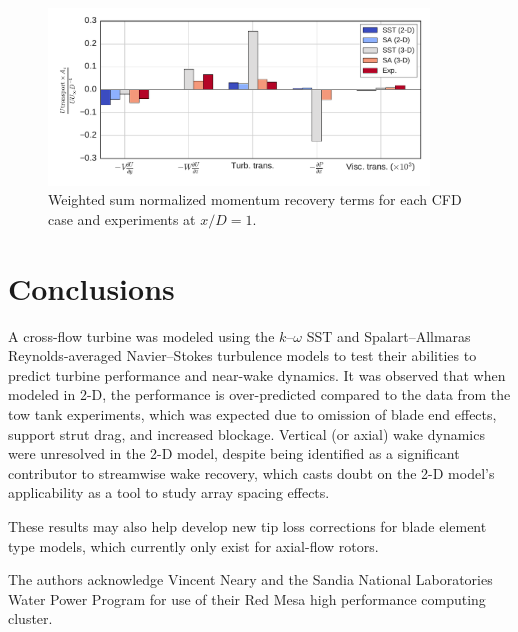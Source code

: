 \documentclass[aip,graphicx]{revtex4-1}
\begin{document}
\begin{figure}[ht]
    \centering

    \includegraphics[width=0.9\textwidth]{figures/mom_bar_graph}

    \caption{Weighted sum normalized momentum recovery terms for each CFD case
        and experiments\cite{Bachant2015-RVAT-Re-dep-data} at $x/D=1$.}

    \label{fig:recovery}
\end{figure}


\section{Conclusions}

A cross-flow turbine was modeled using the $k$--$\omega$ SST and
Spalart--Allmaras Reynolds-averaged Navier--Stokes turbulence models to test
their abilities to predict turbine performance and near-wake dynamics. It was
observed that when modeled in 2-D, the performance is over-predicted compared to
the data from the tow tank experiments, which was expected due to omission of
blade end effects, support strut drag, and increased blockage. Vertical (or
axial) wake dynamics were unresolved in the 2-D model, despite being identified
as a significant contributor to streamwise wake recovery, which casts doubt on
the 2-D model's applicability as a tool to study array spacing effects.

These results may also help develop new tip loss corrections for blade element
type models, which currently only exist for axial-flow rotors.


\begin{acknowledgments}
The authors acknowledge Vincent Neary and the Sandia National Laboratories Water
Power Program for use of their Red Mesa high performance computing cluster.
\end{acknowledgments}


\end{document}

